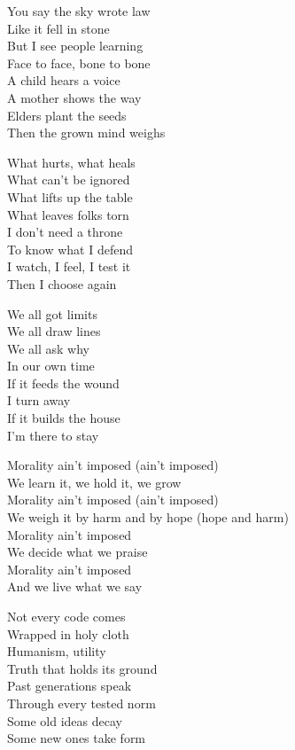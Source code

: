 \begin{lyrics}
You say the sky wrote law\\
Like it fell in stone\\
But I see people learning\\
Face to face, bone to bone\\
A child hears a voice\\
A mother shows the way\\
Elders plant the seeds\\
Then the grown mind weighs

What hurts, what heals\\
What can’t be ignored\\
What lifts up the table\\
What leaves folks torn\\
I don’t need a throne\\
To know what I defend\\
I watch, I feel, I test it\\
Then I choose again

We all got limits\\
We all draw lines\\
We all ask why\\
In our own time\\
If it feeds the wound\\
I turn away\\
If it builds the house\\
I’m there to stay

Morality ain’t imposed (ain’t imposed)\\
We learn it, we hold it, we grow\\
Morality ain’t imposed (ain’t imposed)\\
We weigh it by harm and by hope
(hope and harm)\\
Morality ain’t imposed\\
We decide what we praise\\
Morality ain’t imposed\\
And we live what we say

Not every code comes\\
Wrapped in holy cloth\\
Humanism, utility\\
Truth that holds its ground\\
Past generations speak\\
Through every tested norm\\
Some old ideas decay\\
Some new ones take form


\end{lyrics}

